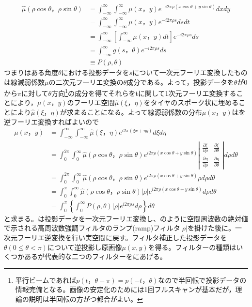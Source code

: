 \begin{align}
\hat{\mu}(\rho\cos{\theta}，\rho\sin{\theta})&=\int^{\infty}_{-\infty}\int^{\infty}_{-\infty}\mu(x，y)e^{-i2\pi\rho(x\cos{\theta}+y\sin{\theta})}dxdy\\&=\int^{\infty}_{-\infty}\int^{\infty}_{-\infty}\mu(x，y)e^{-i2\pi\rho s}dsdt\\
&=\int^{\infty}_{-\infty}\left[\int^{\infty}_{-\infty}\mu(x，y)dt\right]e^{-i2\pi\rho s}ds\\
&=\int^{\infty}_{-\infty}g(s，\theta)e^{-i2\pi\rho s}ds\\\label{eq:mu_hat}
&\equiv P(\rho,\theta)
\end{align}
つまりはある角度$\theta$における投影データを$s$について一次元フーリエ変換したものは線減弱係数$\mu$の二次元フーリエ変換の$\theta$成分である。よって，投影データを$\theta$が0から$\pi$に対して$\theta$方向\footnote{平行ビームであれば$p(t，\theta+\pi)=p(-t，\theta)$なので半回転で投影データの情報完備となる。画像の安定化のためには1回フルスキャンが基本だが，理論の説明は半回転の方がつ都合がよい。}の成分を得てそれらをtに関して1次元フーリエ変換することにより，$\mu(x，y)$のフーリエ空間$\hat{\mu}(\xi，\eta)$をタイヤのスポーク状に埋めることにより$\hat{\mu}(\xi，\eta)$が求まることになる。よって線源弱係数の分布$\mu(x，y)$はを逆フーリエ変換すればよいので
\begin{align}
\mu(x，y)&= \int^{\infty}_{-\infty}\int^{\infty}_{-\infty}\hat{\mu}(\xi，\eta)e^{i2\pi(\xi x+\eta y)}d\xi d\eta\\
&= \int^{2\pi}_{0}\int^{\infty}_{0}\hat{\mu}(\rho\cos{\theta}，\rho\sin{\theta})e^{i2\pi\rho(x\cos{\theta} +y\sin{\theta} )} \displaystyle\left|
    \begin{array}{cc}
      \displaystyle\frac{\partial \xi}{\partial \rho} &  \displaystyle\frac{\partial \xi}{\partial \theta}  \\
      \displaystyle\frac{\partial \eta}{\partial \rho}  &  \displaystyle\frac{\partial \eta}{\partial \theta} 
    \end{array}
  \right|d\rho d\theta\\
  &= \int^{2\pi}_{0}\int^{\infty}_{0}\hat{\mu}(\rho\cos{\theta}，\rho\sin{\theta})e^{i2\pi\rho(x\cos{\theta} +y\sin{\theta} )} \rho d\rho d\theta\\
  &= \int^{\pi}_{0}\int^{\infty}_{0}\hat{\mu}(\rho\cos{\theta}，\rho\sin{\theta})|\rho|e^{i2\pi\rho(x\cos{\theta} +y\sin{\theta} )}  d\rho d\theta\\
    &= \int^{\pi}_{0}\left\{\int^{\infty}_{0}P(\rho,\theta)|\rho|e^{i2\pi\rho s}  d\rho\right\} d\theta\label{eq:FBP_end}
\end{align}
と求まる。は投影データを一次元フーリエ変換し、のように空間周波数の絶対値で示される高周波数強調フィルタのランプ(ramp)フィルタ$|\rho|$を掛けた後に。一次元フーリエ逆変換を行い実空間に戻す。フィルタ補正した投影データを$\theta(0\leq\theta<\pi)$について逆投影し原画像$\mu(x,y)$を得る。フィルターの種類はいくつかあるが代表的な二つのフィルターをにあげる。

